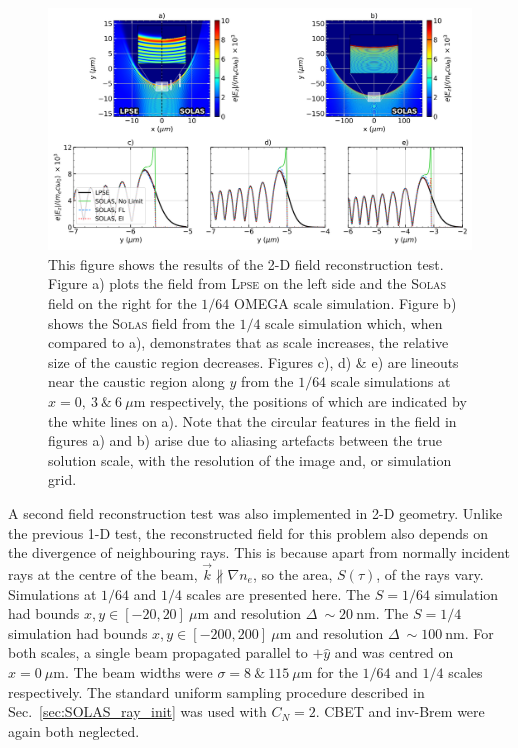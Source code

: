 \begin{figure}[t!]
    \includegraphics[width=1.0\linewidth]{Numerics/Images/2D_field_reconstruction_lineouts_alt.png}
    \centering
    \caption{This figure shows the results of the 2-D field reconstruction test.
    Figure a) plots the field from \textsc{Lpse} on the left side and the \textsc{Solas} field on the right for the $1/64$ OMEGA scale simulation.
    Figure b) shows the \textsc{Solas} field from the $1/4$ scale simulation which, when compared to a), demonstrates that as scale increases, the relative size of the caustic region decreases.
    Figures c), d) \& e) are lineouts near the caustic region along $y$ from the $1/64$ scale simulations at $x=0,\ 3\ \text{\&}\ 6\ \mu\text{m}$ respectively, the positions of which are indicated by the white lines on a).
    Note that the circular features in the field in figures a) and b) arise due to aliasing artefacts between the true solution scale, with the resolution of the image and, or simulation grid.}%
    \label{fig:SOLAS_2d_field_test}
\end{figure}

A second field reconstruction test was also implemented in 2-D geometry.
Unlike the previous 1-D test, the reconstructed field for this problem also depends on the divergence of neighbouring rays.
This is because apart from normally incident rays at the centre of the beam, $\vec{k}\nparallel\nabla n_e$, so the area, $S(\tau)$, of the rays vary.
Simulations at $1/64$ and $1/4$ scales are presented here.
The $S=1/64$ simulation had bounds $x,y\in [-20,20]\ \mu\text{m}$ and resolution $\Delta\ \sim 20\ \text{nm}$.
The $S=1/4$ simulation had bounds $x,y\in [-200,200]\ \mu\text{m}$ and resolution $\Delta\ \sim 100\ \text{nm}$.
For both scales, a single beam propagated parallel to $+\hat{y}$ and was centred on $x=0\ \mu\text{m}$.
The beam widths were $\sigma=8\ \text{\&}\ 115\ \mu\text{m}$ for the $1/64$ and $1/4$ scales respectively.
The standard uniform sampling procedure described in Sec.~\ref{sec:SOLAS_ray_init} was used with $C_N=2$.
\ac{CBET} and \ac{inv-Brem} were again both neglected.

